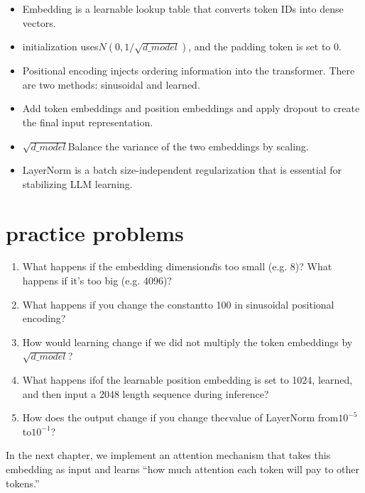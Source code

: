 \begin{itemize}
\item Embedding is a learnable lookup table that converts token IDs into dense vectors.
\item initialization uses$N(0, 1/\sqrt{d\_{model}})$, and the padding token is set to 0.
\item Positional encoding injects ordering information into the transformer. There are two methods: sinusoidal and learned.
\item Add token embeddings and position embeddings and apply dropout to create the final input representation.
\item $\sqrt{d\_{model}}$Balance the variance of the two embeddings by scaling.
\item LayerNorm is a batch size-independent regularization that is essential for stabilizing LLM learning.
\end{itemize}

\section{practice problems}

\begin{enumerate}
\item What happens if the embedding dimension$d$is too small (e.g. 8)? What happens if it's too big (e.g. 4096)?
\item What happens if you change the constantto 100 in sinusoidal positional encoding?
\item How would learning change if we did not multiply the token embeddings by$\sqrt{d\_{model}}$?
\item What happens ifof the learnable position embedding is set to 1024, learned, and then input a 2048 length sequence during inference?
\item How does the output change if you change the$\epsilon$value of LayerNorm from$10^{-5}$to$10^{-1}$?
\end{enumerate}

In the next chapter, we implement an attention mechanism that takes this embedding as input and learns ``how much attention each token will pay to other tokens.''

